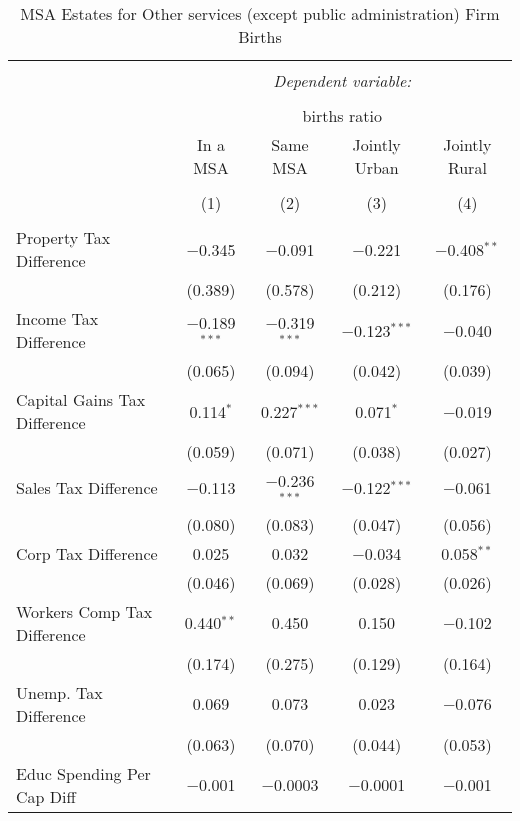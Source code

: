 
\begin{table}[!htbp] \centering 
  \caption{MSA Estates for  Other services (except public administration) Firm Births} 
  \label{} 
\begin{tabular}{@{\extracolsep{5pt}}lcccc} 
\\[-1.8ex]\hline 
\hline \\[-1.8ex] 
 & \multicolumn{4}{c}{\textit{Dependent variable:}} \\ 
\cline{2-5} 
\\[-1.8ex] & \multicolumn{4}{c}{births ratio} \\ 
 & In a MSA & Same MSA & Jointly Urban & Jointly Rural \\ 
\\[-1.8ex] & (1) & (2) & (3) & (4)\\ 
\hline \\[-1.8ex] 
 Property Tax Difference & $-$0.345 & $-$0.091 & $-$0.221 & $-$0.408$^{**}$ \\ 
  & (0.389) & (0.578) & (0.212) & (0.176) \\ 
  Income Tax Difference & $-$0.189$^{***}$ & $-$0.319$^{***}$ & $-$0.123$^{***}$ & $-$0.040 \\ 
  & (0.065) & (0.094) & (0.042) & (0.039) \\ 
  Capital Gains Tax Difference & 0.114$^{*}$ & 0.227$^{***}$ & 0.071$^{*}$ & $-$0.019 \\ 
  & (0.059) & (0.071) & (0.038) & (0.027) \\ 
  Sales Tax Difference & $-$0.113 & $-$0.236$^{***}$ & $-$0.122$^{***}$ & $-$0.061 \\ 
  & (0.080) & (0.083) & (0.047) & (0.056) \\ 
  Corp Tax Difference & 0.025 & 0.032 & $-$0.034 & 0.058$^{**}$ \\ 
  & (0.046) & (0.069) & (0.028) & (0.026) \\ 
  Workers Comp Tax Difference & 0.440$^{**}$ & 0.450 & 0.150 & $-$0.102 \\ 
  & (0.174) & (0.275) & (0.129) & (0.164) \\ 
  Unemp. Tax Difference & 0.069 & 0.073 & 0.023 & $-$0.076 \\ 
  & (0.063) & (0.070) & (0.044) & (0.053) \\ 
  Educ Spending Per Cap Diff & $-$0.001 & $-$0.0003 & $-$0.0001 & $-$0.001 \\ 

\end{tabular}
\end{table}

